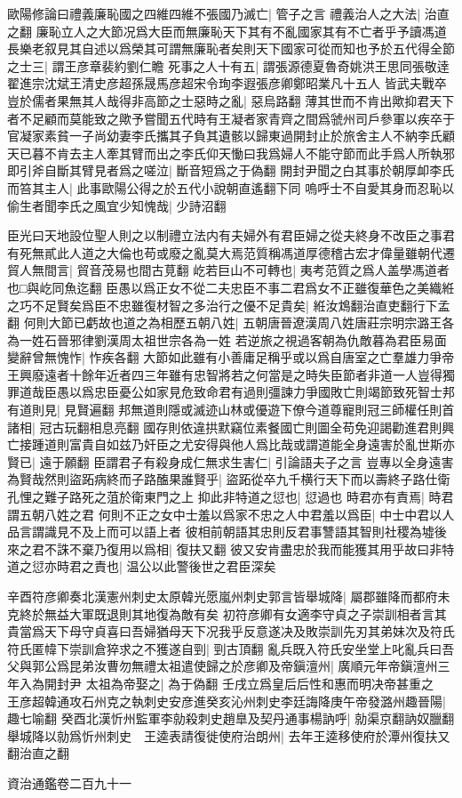 歐陽修論曰禮義廉恥國之四維四維不張國乃滅亡|{
	管子之言}
禮義治人之大法|{
	治直之翻}
廉恥立人之大節况爲大臣而無廉恥天下其有不亂國家其有不亡者乎予讀馮道長樂老叙見其自述以爲榮其可謂無廉恥者矣則天下國家可從而知也予於五代得全節之士三|{
	謂王彦章裴約劉仁瞻}
死事之人十有五|{
	謂張源德夏魯奇姚洪王思同張敬逹翟進宗沈斌王清史彦超孫晟馬彦超宋令珣李遐張彦卿鄭昭業凡十五人}
皆武夫戰卒豈於儒者果無其人哉得非高節之士惡時之亂|{
	惡烏路翻}
薄其世而不肯出歟抑君天下者不足顧而莫能致之歟予嘗聞五代時有王凝者家青齊之間爲虢州司戶參軍以疾卒于官凝家素貧一子尚幼妻李氏攜其子負其遺骸以歸東過開封止於旅舍主人不納李氏顧天已暮不肯去主人牽其臂而出之李氏仰天慟曰我爲婦人不能守節而此手爲人所執邪即引斧自斷其臂見者爲之嗟泣|{
	斷音短爲之于偽翻}
開封尹聞之白其事於朝厚卹李氏而笞其主人|{
	此事歐陽公得之於五代小說朝直遙翻下同}
嗚呼士不自愛其身而忍恥以偷生者聞李氏之風宜少知愧哉|{
	少詩沼翻}


臣光曰天地設位聖人則之以制禮立法内有夫婦外有君臣婦之從夫終身不改臣之事君有死無貳此人道之大倫也苟或廢之亂莫大焉范質稱馮道厚德稽古宏才偉量雖朝代遷貿人無間言|{
	貿音茂易也間古莧翻}
屹若巨山不可轉也|{
	夷考范質之爲人盖學馮道者也□與屹同魚迄翻}
臣愚以爲正女不從二夫忠臣不事二君爲女不正雖復華色之美織絍之巧不足賢矣爲臣不忠雖復材智之多治行之優不足貴矣|{
	絍汝鴆翻治直吏翻行下孟翻}
何則大節已虧故也道之為相歷五朝八姓|{
	五朝唐晉遼漢周八姓唐莊宗明宗潞王各為一姓石晉邪律劉漢周太祖世宗各為一姓}
若逆旅之視過客朝為仇敵暮為君臣易面變辭曾無愧怍|{
	怍疾各翻}
大節如此雖有小善庸足稱乎或以爲自唐室之亡羣雄力爭帝王興廢遠者十餘年近者四三年雖有忠智將若之何當是之時失臣節者非道一人豈得獨罪道哉臣愚以爲忠臣憂公如家見危致命君有過則彊諫力爭國敗亡則竭節致死智士邦有道則見|{
	見賢遍翻}
邦無道則隱或滅迹山林或優遊下僚今道尊寵則冠三師權任則首諸相|{
	冠古玩翻相息亮翻}
國存則依違拱默竊位素餐國亡則圖全苟免迎謁勸進君則興亡接踵道則富貴自如兹乃奸臣之尤安得與他人爲比哉或謂道能全身遠害於亂世斯亦賢已|{
	遠于願翻}
臣謂君子有殺身成仁無求生害仁|{
	引論語夫子之言}
豈專以全身遠害為賢哉然則盜跖病終而子路醢果誰賢乎|{
	盜跖從卒九千横行天下而以壽終子路仕衛孔悝之難子路死之菹於衛東門之上}
抑此非特道之愆也|{
	愆過也}
時君亦有責焉|{
	時君謂五朝八姓之君}
何則不正之女中士羞以爲家不忠之人中君羞以爲臣|{
	中士中君以人品言謂識見不及上而可以語上者}
彼相前朝語其忠則反君事讐語其智則社稷為墟後來之君不誅不棄乃復用以爲相|{
	復扶又翻}
彼又安肯盡忠於我而能獲其用乎故曰非特道之愆亦時君之責也|{
	温公以此警後世之君臣深矣}


辛酉符彦卿奏北漢憲州刺史太原韓光愿嵐州刺史郭言皆舉城降|{
	屬郡雖降而都府未克終於無益大軍既退則其地復為敵有矣}
初符彦卿有女適李守貞之子崇訓相者言其貴當爲天下母守貞喜曰吾婦猶母天下况我乎反意遂决及敗崇訓先刃其弟妹次及符氏符氏匿幃下崇訓倉猝求之不獲遂自剄|{
	剄古頂翻}
亂兵既入符氏安坐堂上叱亂兵曰吾父與郭公爲昆弟汝曹勿無禮太祖遣使歸之於彦卿及帝鎭澶州|{
	廣順元年帝鎭澶州三年入為開封尹}
太祖為帝娶之|{
	為于偽翻}
壬戌立爲皇后后性和惠而明决帝甚重之　王彦超韓通攻石州克之執刺史安彦進癸亥沁州刺史李廷誨降庚午帝發潞州趣晉陽|{
	趣七喻翻}
癸酉北漢忻州監軍李勍殺刺史趙臯及契丹通事楊訥呼|{
	勍渠京翻訥奴臘翻}
舉城降以勍爲忻州刺史　王逵表請復徙使府治朗州|{
	去年王逵移使府於潭州復扶又翻治直之翻}


資治通鑑卷二百九十一
